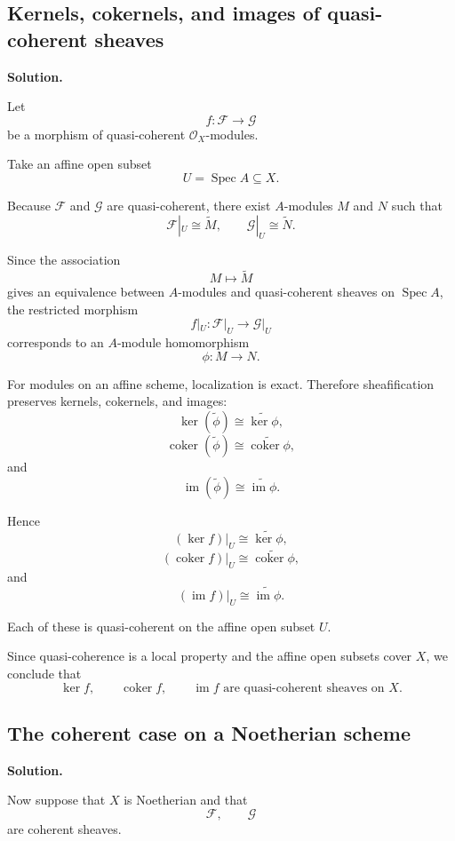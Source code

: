 \documentclass[12pt,a4paper]{article}
\DeclareMathOperator{\im}{im}
\DeclareMathOperator{\coker}{coker}
\DeclareMathOperator{\Spec}{Spec}
\newcommand{\OO}{\mathcal{O}}
\providecommand{\Spec}{\operatorname{Spec}}
\theoremstyle{notespace}
\begin{document}
\subsection{Kernels, cokernels, and images of quasi-coherent sheaves}

\textbf{Solution.}

Let
\[
f:\mathcal{F}\longrightarrow \mathcal{G}
\]
be a morphism of quasi-coherent \(\OO_X\)-modules.

Take an affine open subset
\[
U=\Spec A\subseteq X.
\]

Because \(\mathcal{F}\) and \(\mathcal{G}\) are quasi-coherent, there exist \(A\)-modules \(M\) and \(N\) such that
\[
\mathcal{F}|_U\cong \widetilde{M},
\qquad
\mathcal{G}|_U\cong \widetilde{N}.
\]

Since the association
\[
M\longmapsto \widetilde{M}
\]
gives an equivalence between \(A\)-modules and quasi-coherent sheaves on \(\Spec A\), the restricted morphism
\[
f|_U:\mathcal{F}|_U\longrightarrow \mathcal{G}|_U
\]
corresponds to an \(A\)-module homomorphism
\[
\phi:M\longrightarrow N.
\]

For modules on an affine scheme, localization is exact. Therefore sheafification preserves kernels, cokernels, and images:
\[
\ker(\widetilde{\phi})
\cong
\widetilde{\ker\phi},
\]
\[
\coker(\widetilde{\phi})
\cong
\widetilde{\coker\phi},
\]
and
\[
\im(\widetilde{\phi})
\cong
\widetilde{\im\phi}.
\]

Hence
\[
(\ker f)|_U
\cong
\widetilde{\ker\phi},
\]
\[
(\coker f)|_U
\cong
\widetilde{\coker\phi},
\]
and
\[
(\im f)|_U
\cong
\widetilde{\im\phi}.
\]

Each of these is quasi-coherent on the affine open subset \(U\).

Since quasi-coherence is a local property and the affine open subsets cover \(X\), we conclude that
\[
\boxed{
	\ker f,\qquad \coker f,\qquad \im f
	\text{ are quasi-coherent sheaves on }X.
}
\]

\subsection{The coherent case on a Noetherian scheme}

\textbf{Solution.}

Now suppose that \(X\) is Noetherian and that
\[
\mathcal{F},
\qquad
\mathcal{G}
\]
are coherent sheaves.
\end{document}
